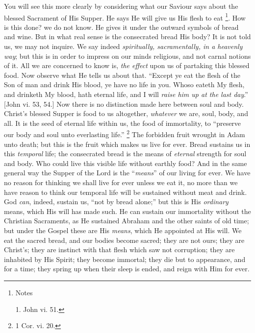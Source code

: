 You will see this more clearly by considering what our
Saviour says about the blessed Sacrament of His Supper.
He says He will give us His flesh to eat \footnote{Notes

1. John vi. 51.}.
How is this done? we do not know. He gives it under the
outward symbols of bread and wine. But in what real sense
is the consecrated bread His body? It is not told us, we
may not inquire. We say indeed \emph{spiritually,
sacramentally, in a heavenly way}; but this is in
order to impress on our minds religious, and not carnal
notions of it. All we are concerned to know is, \emph{the
effect} upon us of partaking this blessed food. Now
observe what He tells us about that. ``Except ye eat
the flesh of the Son of man and drink His blood, ye have
no life in you. Whoso eateth My flesh, and drinketh My
blood, hath eternal life, and I will \emph{raise him up at
the last day}.'' [John vi. 53, 54.] Now there is
no distinction made here between soul and body. Christ's
blessed Supper is food to us altogether, \emph{whatever}
we are, soul, body, and all. It is the seed of eternal
life within us, the food of immortality, to
``preserve our body and soul unto everlasting
life.'' \footnote{1 Cor. vi. 20.}
The forbidden fruit wrought in Adam unto death; but this
is the fruit which makes us live for ever. Bread sustains
us in this \emph{temporal} life; the consecrated bread is
the means of \emph{eternal} strength for soul and body.
Who could live this visible life without earthly food?
And in the same general way the Supper of the Lord is the
``\emph{means}'' of our living for ever. We have
no reason for thinking we shall live for ever unless we
eat it, no more than we have reason to think our temporal
life will be sustained without meat and drink. God \emph{can},
indeed, sustain us, ``not by bread alone;'' but
this is His \emph{ordinary} means, which His will has
made such. He can sustain our immortality without the
Christian Sacraments, as He sustained Abraham and the
other saints of old time; but under the Gospel these are
His \emph{means}, which He appointed at His will. We eat
the sacred bread, and our bodies become sacred; they are
not ours; they are Christ's; they are instinct with that
flesh which saw not corruption; they are inhabited by His
Spirit; they become immortal; they die but to appearance,
and for a time; they spring up when their sleep is ended,
and reign with Him for ever.

